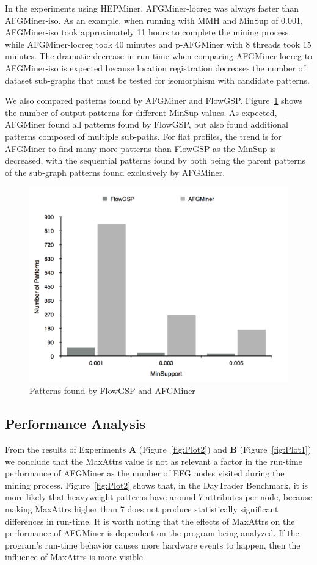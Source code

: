 In the experiments using HEPMiner, AFGMiner-locreg was always faster than AFGMiner-iso. As an example, when running with MMH and MinSup of 0.001, AFGMiner-iso took approximately 11 hours to complete the mining process, while AFGMiner-locreg took 40 minutes and p-AFGMiner with 8 threads took 15 minutes. The dramatic decrease in run-time when comparing AFGMiner-locreg to AFGMiner-iso is expected because location registration decreases the number of dataset sub-graphs that must be tested for isomorphism with candidate patterns. 

We also compared patterns found by AFGMiner and FlowGSP. Figure~\ref{fig:NumPatterns} shows the number of output patterns for different MinSup values. As expected, AFGMiner found all patterns found by FlowGSP, but also found additional patterns composed of multiple sub-paths. For flat profiles, the trend is for AFGMiner to find many more patterns than FlowGSP as the MinSup is decreased, with the sequential patterns found by both being the parent patterns of the sub-graph patterns found exclusively by AFGMiner. 

\begin{figure}[h!]
\centering
    \includegraphics[scale=0.18]{figures/numPatternsComp.pdf}
    \caption{Patterns found by FlowGSP and AFGMiner}
    \label{fig:NumPatterns}
\end{figure}

\subsection{Performance Analysis}
\label{subsec:Scalability}
From the results of Experiments {\bf A} (Figure~\ref{fig:Plot2}) and {\bf B} (Figure~\ref{fig:Plot1}) we conclude that the MaxAttrs value is not as relevant a factor in the run-time performance of AFGMiner as the number of EFG nodes visited during the mining process. Figure~\ref{fig:Plot2} shows that, in the DayTrader Benchmark, it is more likely that heavyweight patterns have around 7 attributes per node, because making MaxAttrs higher than 7 does not produce statistically significant differences in run-time. It is worth noting that the effects of MaxAttrs on the performance of AFGMiner is dependent on the program being analyzed. If the program's run-time behavior causes more hardware events to happen, then the influence of MaxAttrs is more visible.


